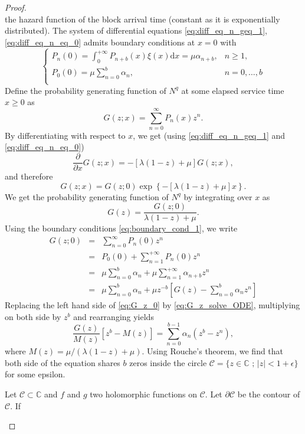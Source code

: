 \begin{proof}
$$$$
the hazard function of the block arrival time (constant as it is exponentially distributed). The system of differential equations \eqref{eq:diff_eq_n_geq_1}, \eqref{eq:diff_eq_n_eq_0} admits boundary conditions at $x = 0$ with 
\begin{equation}\label{eq:boundary_cond_1}
\begin{cases}
P_{n}(0) = \int_0^{+\infty} P_{n+b}(x)\xi(x)\text{d}x = \mu\alpha_{n+b},&n \geq1,\\
P_{0}(0) = \mu\sum_{n=0}^{b}\alpha_n,&n = 0,\ldots,b\\
\end{cases}
\end{equation}
Define the probability generating function of $N^q$ at some elapsed service time $x\geq 0$ as 
$$
G(z;x) = \sum_{n=0}^\infty P_{n}(x)z^n.
$$
By differentiating with respect to $x$, we get (using \eqref{eq:diff_eq_n_geq_1} and \eqref{eq:diff_eq_n_eq_0})
$$
\frac{\partial}{\partial x}G(z;x) = -\left[\lambda(1-z)+\mu\right]G(z;x),
$$
and therefore
$$
G(z;x) = G(z;0)\exp\left\{-\left[\lambda(1-z)+\mu\right]x\right\}.
$$
We get the probability generating function of $N^q$ by integrating over $x$ as 
\begin{equation}\label{eq:G_z_solve_ODE}
G(z) = \frac{G(z;0)}{\lambda(1-z)+\mu}.
\end{equation}
Using the boundary conditions \eqref{eq:boundary_cond_1}, we write 
\begin{eqnarray}
G(z;0) &= &\sum_{n = 0}^\infty P_{n}(0)z^n \nonumber\\
&= &P_{0}(0)+\sum_{n=1}^{+\infty}P_{n}(0)z^n\nonumber\\
&=& \mu\sum_{n = 0}^{b}\alpha_n  + \mu\sum_{n=1}^{+\infty}\alpha_{n+b} z^n\nonumber\\
&=& \mu\sum_{n = 0}^{b}\alpha_n + \mu z^{-b}\left[G(z)-\sum_{n = 0}^{b}\alpha_n z^n\right]\label{eq:G_z_0}
\end{eqnarray}
Replacing the left hand side of \eqref{eq:G_z_0} by \eqref{eq:G_z_solve_ODE}, multiplying on both side by $z^b$ and rearranging yields 
\begin{equation}\label{eq:G_z_as_rational_function}
\frac{G(z)}{M(z)}[z^b - M(z)] =\sum_{n=0}^{b-1}\alpha_n(z^b - z^n), 
\end{equation}
where $M(z) = \mu/(\lambda(1-z)+\mu)$. Using Rouche's theorem, we find that both side of the equation shares $b$ zeros inside the circle $\mathcal{C} = \{z\in\mathbb{C}\text{ ; }|z| <1+\epsilon\}$ for some epsilon. 
\begin{lemma}
Let $\mathcal{C}\subset \mathbb{C}$ and $f$ and $g$ two holomorphic functions on $\mathcal{C}$. Let $\partial\mathcal{C}$ be the contour of $\mathcal{C}$. If 

\end{lemma}
\end{proof}
